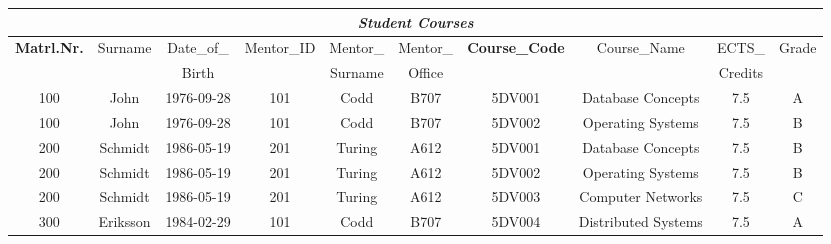 \begin{tabular}{|c|c|c|c|c|c|c|c|c|c|}
  \hline
  \multicolumn{10}{|c|}{\textit{Student Courses}} \\ \hline 
  \textbf{Matrl.Nr.} & Surname & Date\_of\_    & Mentor\_ID & Mentor\_  & Mentor\_   & \textbf{Course\_Code} & Course\_Name    & ECTS\_   & Grade \\ 
                     &         & Birth         &            & Surname  & Office      &                       &                 & Credits  &       \\ 
  \hline \hline
  100 & John     & 1976-09-28 & 101 & Codd   & B707 & 5DV001 & Database Concepts     & 7.5 & A \\ 
  100 & John     & 1976-09-28 & 101 & Codd   & B707 & 5DV002 & Operating Systems     & 7.5 & B \\
  200 & Schmidt  & 1986-05-19 & 201 & Turing & A612 & 5DV001 & Database Concepts     & 7.5 & B \\
  200 & Schmidt  & 1986-05-19 & 201 & Turing & A612 & 5DV002 & Operating Systems     & 7.5 & B \\
  200 & Schmidt  & 1986-05-19 & 201 & Turing & A612 & 5DV003 & Computer  Networks    & 7.5 & C \\
  300 & Eriksson & 1984-02-29 & 101 & Codd   & B707 & 5DV004 & Distributed Systems   & 7.5 & A \\ \hline
\end{tabular}